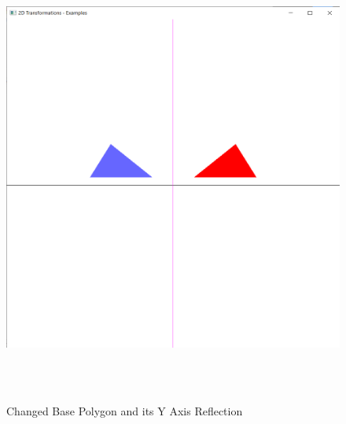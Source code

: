 \documentclass[12pt, a4]{article}
\begin{document}
\subsection*{}
\begin{figure}[h]
\centering
\caption{Changed Base Polygon and its Y Axis Reflection}
\includegraphics[height=15cm, width=15cm]{Outputs/Output-16.png}
\end{figure}

\newpage
\end{document}
